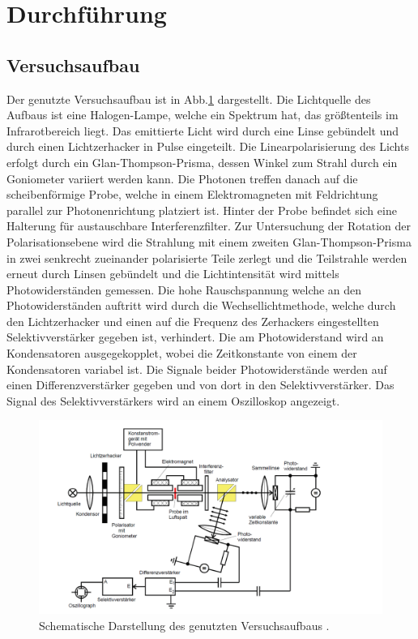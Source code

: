 \section{Durchführung}
\subsection{Versuchsaufbau}
Der genutzte Versuchsaufbau ist in Abb.\ref{Aufbau} dargestellt. Die Lichtquelle des Aufbaus ist eine Halogen-Lampe, welche ein Spektrum hat, das größtenteils im Infrarotbereich liegt. Das emittierte Licht wird durch eine Linse gebündelt und durch einen Lichtzerhacker in Pulse eingeteilt.
Die Linearpolarisierung des Lichts erfolgt durch ein Glan-Thompson-Prisma, dessen Winkel zum Strahl durch ein Goniometer variiert werden kann. Die Photonen treffen danach auf die scheibenförmige Probe, welche in einem Elektromagneten mit Feldrichtung parallel zur Photonenrichtung platziert ist. Hinter der Probe befindet sich eine Halterung für austauschbare Interferenzfilter. Zur Untersuchung der Rotation der Polarisationsebene wird die Strahlung mit einem zweiten Glan-Thompson-Prisma in zwei senkrecht zueinander polarisierte Teile  zerlegt und die Teilstrahle werden erneut durch Linsen gebündelt und die Lichtintensität wird mittels Photowiderständen gemessen. Die hohe Rauschspannung welche an den Photowiderständen auftritt wird durch die Wechsellichtmethode, welche durch den Lichtzerhacker und einen auf die Frequenz des Zerhackers eingestellten Selektivverstärker gegeben ist, verhindert. Die am Photowiderstand wird an Kondensatoren ausgegekopplet, wobei die Zeitkonstante von einem der Kondensatoren variabel ist. Die Signale beider Photowiderstände werden auf einen Differenzverstärker gegeben und von dort in den Selektivverstärker. Das Signal des Selektivverstärkers wird an einem Oszilloskop angezeigt.
\begin{figure}[H]
  \centering
  \includegraphics[width=1\textwidth]{bilder/aufbau.png}
  \caption{Schematische Darstellung des genutzten Versuchsaufbaus \cite{anleitung}.}
  \label{Aufbau}
\end{figure}
